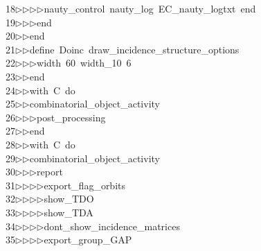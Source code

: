 \begin{tabbing}
18\>$\triangleright$\>$\triangleright$\>$\triangleright$\>$\triangleright$\>nauty\_control\ nauty\_log\ EC\_nauty\_logtxt\ end\ \\[0pt]
19\>$\triangleright$\>$\triangleright$\>$\triangleright$\>end\ \\[0pt]
20\>$\triangleright$\>$\triangleright$\>end\ \\[0pt]
21\>$\triangleright$\>$\triangleright$\>define\ Doinc\ draw\_incidence\_structure\_options\ \\[0pt]
22\>$\triangleright$\>$\triangleright$\>$\triangleright$\>width\ 60\ width\_10\ 6\ \\[0pt]
23\>$\triangleright$\>$\triangleright$\>end\ \\[0pt]
24\>$\triangleright$\>$\triangleright$\>with\ C\ do\ \\[0pt]
25\>$\triangleright$\>$\triangleright$\>combinatorial\_object\_activity\ \\[0pt]
26\>$\triangleright$\>$\triangleright$\>$\triangleright$\>post\_processing\ \\[0pt]
27\>$\triangleright$\>$\triangleright$\>end\ \\[0pt]
28\>$\triangleright$\>$\triangleright$\>with\ C\ do\ \\[0pt]
29\>$\triangleright$\>$\triangleright$\>combinatorial\_object\_activity\ \\[0pt]
30\>$\triangleright$\>$\triangleright$\>$\triangleright$\>report\ \\[0pt]
31\>$\triangleright$\>$\triangleright$\>$\triangleright$\>$\triangleright$\>export\_flag\_orbits\ \\[0pt]
32\>$\triangleright$\>$\triangleright$\>$\triangleright$\>$\triangleright$\>show\_TDO\ \\[0pt]
33\>$\triangleright$\>$\triangleright$\>$\triangleright$\>$\triangleright$\>show\_TDA\ \\[0pt]
34\>$\triangleright$\>$\triangleright$\>$\triangleright$\>$\triangleright$\>dont\_show\_incidence\_matrices\ \\[0pt]
35\>$\triangleright$\>$\triangleright$\>$\triangleright$\>$\triangleright$\>export\_group\_GAP\ \\[0pt]

\end{tabbing}
